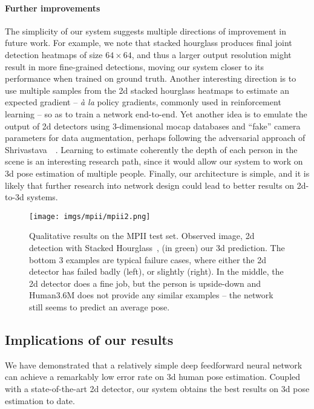 \documentclass[10pt,twocolumn,letterpaper]{article}
\begin{document}
\paragraph{Further improvements}
The simplicity of our system suggests multiple directions of improvement in future work.
For example, we note that stacked hourglass produces final joint detection heatmaps of size $64 \times 64$, and thus a larger output resolution might result in more fine-grained detections, moving our system closer to its performance when trained on ground truth.
Another interesting direction is to use multiple samples from the 2d stacked hourglass heatmaps to estimate an expected gradient -- \emph{{\`a} la} policy gradients, commonly used in reinforcement learning -- so as to train a network end-to-end.
Yet another idea is to emulate the output of 2d detectors using 3-dimensional mocap databases and ``fake'' camera parameters for data augmentation, perhaps following the adversarial approach of Shrivastava~\etal~\cite{shrivastava2016learning}.
Learning to estimate coherently the depth of each person in the scene is an interesting research path, since it would allow our system to work on 3d pose estimation of multiple people.
Finally, our architecture is simple, and it is likely that further research into network design could lead to better results on 2d-to-3d systems.

\begin{figure*}[t]
  \texttt{[image: imgs/mpii/mpii2.png]}
  \vspace{-3mm}
  \caption{Qualitative results on the MPII test set. Observed image, 2d detection with Stacked Hourglass~\cite{stacked-hourglass}, (in green) our 3d prediction. The bottom 3 examples are typical failure cases, where either the 2d detector has failed badly (left), or slightly (right). In the middle, the 2d detector does a fine job, but the person is upside-down and Human3.6M does not provide any similar examples -- the network still seems to predict an average pose.}
  \label{fig:mpii}
\end{figure*}

\subsection{Implications of our results}
We have demonstrated that a relatively simple deep feedforward neural network
can achieve a remarkably low error rate on 3d human pose estimation. Coupled with a state-of-the-art 2d detector, our system 
obtains the best results on 3d pose estimation to date.
\end{document}
